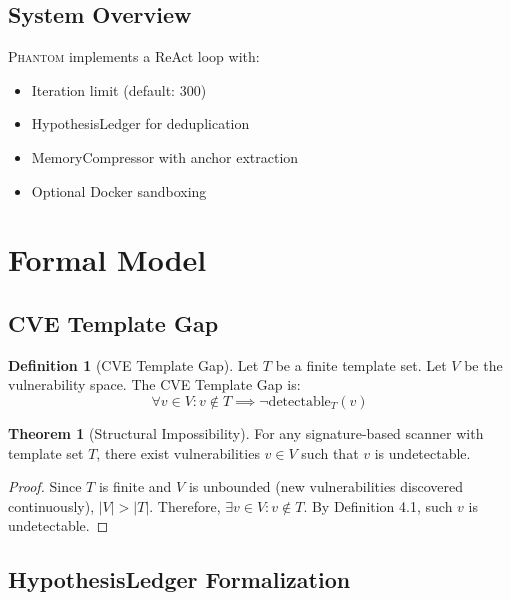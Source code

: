 \documentclass[11pt,a4paper]{article}
\theoremstyle{definition}
\newtheorem{definition}{Definition}[section]
\newtheorem{theorem}{Theorem}[section]
\newcommand{\phantom}{\textsc{Phantom}}
\begin{document}
\subsection{System Overview}

\phantom{} implements a ReAct loop with:
\begin{itemize}[leftmargin=*]
    \item Iteration limit (default: 300)
    \item HypothesisLedger for deduplication
    \item MemoryCompressor with anchor extraction
    \item Optional Docker sandboxing
\end{itemize}

\section{Formal Model}
\label{sec:formal}

\subsection{CVE Template Gap}

\begin{definition}[CVE Template Gap]
Let $T$ be a finite template set. Let $V$ be the vulnerability space. The CVE Template Gap is:
\begin{equation}
\forall v \in V : v \notin T \implies \neg\text{detectable}_T(v)
\end{equation}
\end{definition}

\begin{theorem}[Structural Impossibility]
For any signature-based scanner with template set $T$, there exist vulnerabilities $v \in V$ such that $v$ is undetectable.
\end{theorem}

\begin{proof}
Since $T$ is finite and $V$ is unbounded (new vulnerabilities discovered continuously), $|V| > |T|$. Therefore, $\exists v \in V : v \notin T$. By Definition 4.1, such $v$ is undetectable.
\end{proof}

\subsection{HypothesisLedger Formalization}
\end{document}
